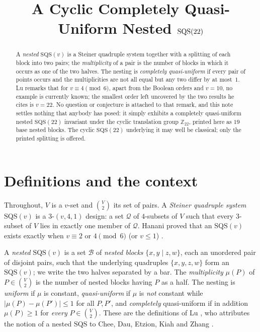 \documentclass[11pt]{amsart}
\title[A cyclic completely quasi-uniform nested $\SQS(22)$]
{A Cyclic Completely Quasi-Uniform Nested $\SQS(22)$}
\date{}
\theoremstyle{remark}
\newcommand{\SQS}{\mathrm{SQS}}
\newcommand{\Zn}[1]{\mathbb{Z}_{#1}}
\newcommand{\nb}[4]{\{#1,#2\mid #3,#4\}}
\begin{document}
\begin{abstract}
A \emph{nested} $\SQS(v)$ is a Steiner quadruple system together with a
splitting of each block into two pairs; the \emph{multiplicity} of a pair is the
number of blocks in which it occurs as one of the two halves. The nesting is
\emph{completely quasi-uniform} if every pair of points occurs and the
multiplicities are not all equal but any two differ by at most~$1$. Lu remarks
that for $v\equiv4\pmod6$, apart from the Boolean orders and $v=10$, no example
is currently known; the smallest order left uncovered by the two results he
cites is $v=22$. No question or conjecture is attached to that remark, and this
note settles nothing that anybody has posed: it simply exhibits a completely
quasi-uniform nested $\SQS(22)$ invariant under the cyclic translation group
$\Zn{22}$, printed here as $19$ base nested blocks. The cyclic $\SQS(22)$
underlying it may well be classical; only the printed splitting is offered.
\end{abstract}

\maketitle

\section{Definitions and the context}

Throughout, $V$ is a $v$-set and $\binom{V}{2}$ its set of pairs. A
\emph{Steiner quadruple system} $\SQS(v)$ is a $3$-$(v,4,1)$ design: a set
$\mathcal Q$ of $4$-subsets of $V$ such that every $3$-subset of $V$ lies in
exactly one member of $\mathcal Q$. Hanani proved that an $\SQS(v)$ exists
exactly when $v\equiv2$ or $4\pmod 6$ (or $v\le1$) \cite{Hanani60}.

A \emph{nested} $\SQS(v)$ is a set $\mathcal B$ of \emph{nested blocks}
$\nb xyzw$, each an unordered pair of disjoint pairs, such that the underlying
quadruples $\{x,y,z,w\}$ form an $\SQS(v)$; we write the two halves separated
by a bar. The \emph{multiplicity} $\mu(P)$ of $P\in\binom V2$ is the number of
nested blocks having $P$ as a half. The nesting is \emph{uniform} if $\mu$ is
constant, \emph{quasi-uniform} if $\mu$ is \emph{not} constant while
$|\mu(P)-\mu(P')|\le1$ for all $P,P'$, and \emph{completely} quasi-uniform if
in addition $\mu(P)\ge1$ for \emph{every} $P\in\binom V2$. These are the
definitions of Lu \cite{Lu}, who attributes the notion of a nested $\SQS$ to
Chee, Dau, Etzion, Kiah and Zhang \cite{CDEKZ}.
\end{document}
